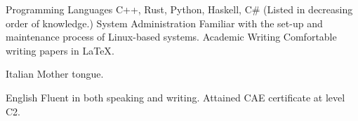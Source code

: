\begin{cvskills}
  \cvskill
    {Programming Languages} %
		{C++, Rust, Python, Haskell, C\# (Listed in decreasing order of knowledge.)} %
  \cvskill
    {System Administration} %
		{Familiar with the set-up and maintenance process of Linux-based systems.} %
  \cvskill
    {Academic Writing} %
		{Comfortable writing papers in { \selectfont \LaTeX}.} %
\end{cvskills}

\begin{cvskills}
  \cvskill
  {Italian}
  {Mother tongue.}
  
  \cvskill
    {English}
    {
        Fluent in both speaking and writing.
		Attained CAE certificate at level C2.
    }
\end{cvskills}
